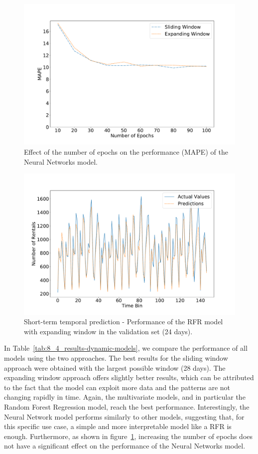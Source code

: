 \begin{figure}
    \begin{center}
            \includegraphics[width=0.65\columnwidth]{figures/temporal_analyses/MAPEEpochs.pdf}
        \caption{Effect of the number of epochs on the performance (MAPE) of the Neural Networks model.}
            \label{fig:8_4_epochs-mape}
    \end{center}
\end{figure}

\begin{figure}
    \begin{center}
            \includegraphics[width=0.65\columnwidth]{figures/temporal_analyses/RandomForestExpandingPredictions.pdf}
        \caption{Short-term temporal prediction - Performance of the RFR model with expanding window in the validation set (24 days).}
            \label{fig:8_4_random-forests-dynamic}

    \end{center}
\end{figure}


In Table~\ref{tab:8_4_results-dynamic-models}, we compare the performance of all models using the two approaches. The best results for the sliding window approach were obtained with the largest possible window (28 days). The expanding window approach offers slightly better results, which can be attributed to the fact that the model can exploit more data and the patterns are not changing rapidly in time. Again, the multivariate models, and in particular the Random Forest Regression model, reach the best performance. Interestingly, the Neural Network model performs similarly to other models, suggesting that, for this specific use case, a simple and more interpretable model like a RFR is enough.
Furthermore, as shown in figure~\ref{fig:8_4_epochs-mape}, increasing the number of epochs does not have a significant effect on the performance of the Neural Networks model.

